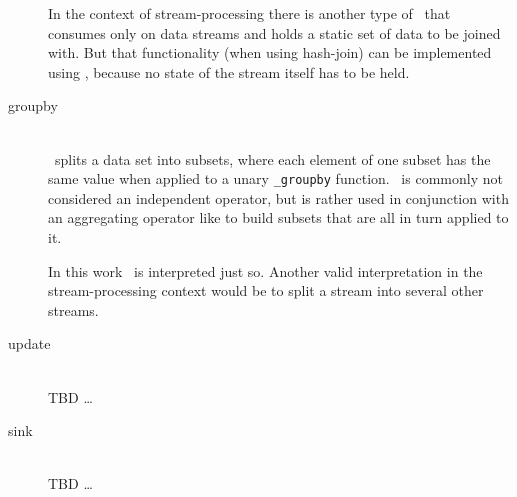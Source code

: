 \begin{description}
In the context of stream-processing there is another type of \join\ that consumes only on data streams and holds a static set of data to be joined with. But that functionality (when using hash-join) can be implemented using \map, because no state of the stream itself has to be held.
	\item[groupby] \hfill \\
	\groupby\ splits a data set into subsets, where each element of one subset has the same value when applied to a unary \texttt{\_groupby} function. \groupby\ is commonly\cite{w3cs:groupby} not considered an independent operator, but is rather used in conjunction with an aggregating operator like \reduce to build subsets that are all in turn applied to it.
	
	In this work \groupby\ is interpreted just so. Another valid interpretation in the stream-processing context would be to split a stream into several other streams.
	\item[update] \hfill \\
  TBD \ldots
	\item[sink] \hfill \\
  TBD \ldots
\end{description}

